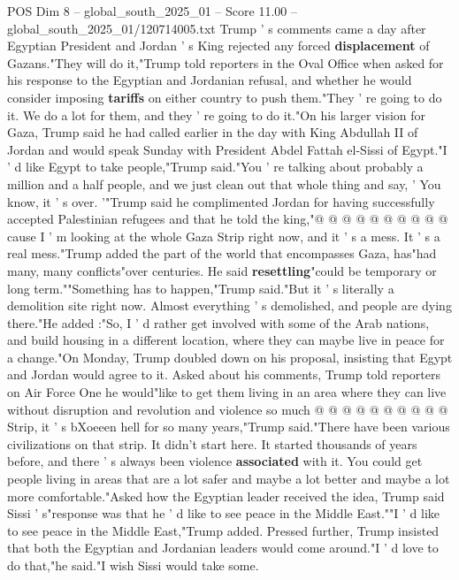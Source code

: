 \begin{textsample}{POS Dim 8 – global\_south\_2025\_01 – Score 11.00 – global\_south\_2025\_01/120714005.txt}  \label{ex:f8_pos_111}
Trump ' s comments came a day after Egyptian President and Jordan ' s King rejected any forced \textbf{displacement} of Gazans."They will do it,"Trump told reporters in the Oval Office when asked for his response to the Egyptian and Jordanian refusal, and whether he would consider imposing \textbf{tariffs} on either country to push them."They ' re going to do it.
We do a lot for them, and they ' re going to do it."On his larger vision for Gaza, Trump said he had called earlier in the day with King Abdullah II of Jordan and would speak Sunday with President Abdel Fattah el-Sissi of Egypt."I ' d like Egypt to take people,"Trump said."You ' re talking about probably a million and a half people, and we just clean out that whole thing and say, ' You know, it ' s over. '"Trump said he complimented Jordan for having successfully accepted Palestinian refugees and that he told the king,"@ @ @ @ @ @ @ @ @ @ cause I ' m looking at the whole Gaza Strip right now, and it ' s a mess.
It ' s a real mess."Trump added the part of the world that encompasses Gaza, has"had many, many conflicts"over centuries.
He said \textbf{resettling}"could be temporary or long term.""Something has to happen,"Trump said."But it ' s literally a demolition site right now.
Almost everything ' s demolished, and people are dying there."He added :"So, I ' d rather get involved with some of the Arab nations, and build housing in a different location, where they can maybe live in peace for a change."On Monday, Trump doubled down on his proposal, insisting that Egypt and Jordan would agree to it.
Asked about his comments, Trump told reporters on Air Force One he would"like to get them living in an area where they can live without disruption and revolution and violence so much @ @ @ @ @ @ @ @ @ @ Strip, it ' s bXoeeen hell for so many years,"Trump said."There have been various civilizations on that strip.
It didn't start here.
It started thousands of years before, and there ' s always been violence \textbf{associated} with it.
You could get people living in areas that are a lot safer and maybe a lot better and maybe a lot more comfortable."Asked how the Egyptian leader received the idea, Trump said Sissi ' s"response was that he ' d like to see peace in the Middle East.""I ' d like to see peace in the Middle East,"Trump added.
Pressed further, Trump insisted that both the Egyptian and Jordanian leaders would come around."I ' d love to do that,"he said."I wish Sissi would take some.

\end{textsample}

